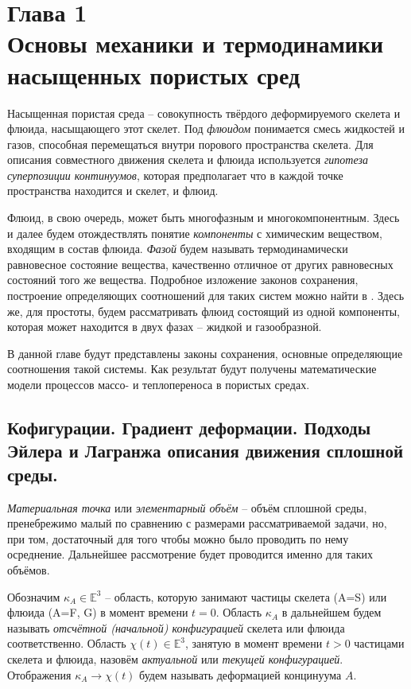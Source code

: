 \section*{Глава 1\\Основы механики и термодинамики насыщенных пористых сред}
\setcounter{section}{1}
\setcounter{subsection}{0}
\setcounter{equation}{0}

	Насыщенная пористая среда -- совокупность твёрдого деформируемого скелета и флюида, насыщающего этот скелет.
	Под \textit{флюидом} понимается смесь жидкостей и газов, способная перемещаться внутри порового пространства скелета.
	Для описания совместного движения скелета и флюида используется \textit{гипотеза суперпозиции континуумов}, которая предполагает что в каждой точке пространства находится и скелет, и флюид. 

	Флюид, в свою очередь, может быть многофазным и многокомпонентным. Здесь и далее будем отождествлять понятие \textit{компоненты} с химическим веществом, входящим в состав флюида. \textit{Фазой} будем называть термодинамически равновесное состояние вещества, качественно отличное от других равновесных состояний того же вещества. Подробное изложение законов сохранения, построение определяющих соотношений для таких систем можно найти в \cite{basniev, fortov, kondaurov, checkalyuk}.
	Здесь же, для простоты, будем рассматривать флюид состоящий из одной компоненты, которая может находится в двух фазах -- жидкой и газообразной.
	
	В данной главе будут представлены законы сохранения, основные определяющие соотношения такой системы. Как результат будут получены математические модели 	процессов массо- и теплопереноса в пористых средах.

\subsection{Кофигурации. Градиент деформации. Подходы Эйлера и Лагранжа описания движения сплошной среды.}
	\textit{Материальная точка} или \textit{элементарный объём} -- объём сплошной среды, пренебрежимо малый по сравнению с размерами рассматриваемой задачи, но, при том,   достаточный для того чтобы можно было проводить по нему осреднение. Дальнейшее рассмотрение будет проводится именно для таких объёмов.
	
	Обозначим $\kappa_A \in \mathbb{E}^3$ -- область, которую занимают частицы скелета (A=S) или флюида (A=F, G) в момент времени $t=0$. Область $\kappa_A$ в дальнейшем будем называть \textit{отсчётной (начальной) конфигурацией} скелета или флюида соответственно. 
	Область $\chi(t) \in \mathbb{E}^3$, занятую в момент времени $t > 0$ частицами скелета и флюида, назовём \textit{актуальной} или \textit{текущей конфигурацией}. Отображения $\kappa_A \to \chi(t)$ будем называть деформацией концинуума $A$.
	
